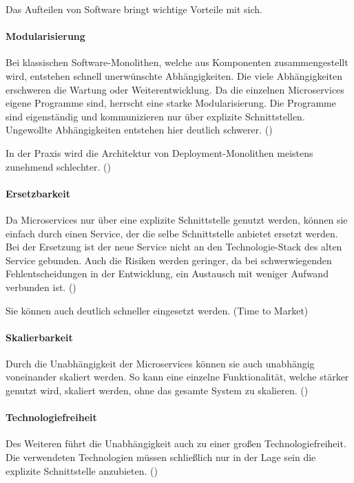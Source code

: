 Das Aufteilen von Software bringt wichtige Vorteile mit sich.

\paragraph{Modularisierung}
Bei klassischen Software-Monolithen, welche aus Komponenten zusammengestellt wird, entstehen schnell unerwünschte Abhängigkeiten. Die viele Abhängigkeiten erschweren die Wartung oder Weiterentwicklung. Da die einzelnen Microservices eigene Programme sind, herrscht eine starke Modularisierung. Die Programme sind eigenständig und kommunizieren nur über explizite Schnittstellen. Ungewollte Abhängigkeiten entstehen hier deutlich schwerer. (\cite[S. 3]{wolffMicroservices2018})

In der Praxis wird die Architektur von Deployment-Monolithen meistens zunehmend schlechter. (\cite[S. 3]{wolffMicroservices2018})

\paragraph{Ersetzbarkeit}
Da Microservices nur über eine explizite Schnittstelle genutzt werden, können sie einfach durch einen Service, der die selbe Schnittstelle anbietet ersetzt werden. Bei der Ersetzung ist der neue Service nicht an den Technologie-Stack des alten Service gebunden. Auch die Risiken werden geringer, da bei schwerwiegenden Fehlentscheidungen in der Entwicklung, ein Austausch mit weniger Aufwand verbunden ist. (\cite[S. 4]{wolffMicroservices2018})

Sie können auch deutlich schneller eingesetzt werden. (Time to Market)

\paragraph{Skalierbarkeit}
Durch die Unabhängigkeit der Microservices können sie auch unabhängig voneinander skaliert werden. So kann eine einzelne Funktionalität, welche stärker genutzt wird, skaliert werden, ohne das gesamte System zu skalieren. (\cite[S. 5]{wolffMicroservices2018})

\paragraph{Technologiefreiheit}

Des Weiteren führt die Unabhängigkeit auch zu einer großen Technologiefreiheit. Die verwendeten Technologien müssen schließlich nur in der Lage sein die explizite Schnittstelle anzubieten. (\cite[S. 5]{wolffMicroservices2018})

